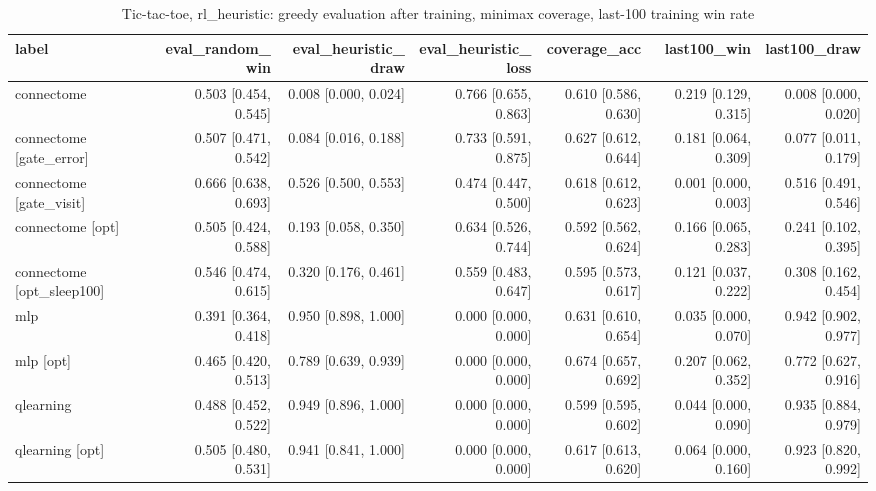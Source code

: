 \begin{table}[t]
\centering
\small
\begin{tabular}{lrrrrrr}
\toprule
label & eval\_random\_win & eval\_heuristic\_draw & eval\_heuristic\_loss & coverage\_acc & last100\_win & last100\_draw \\
\midrule
connectome & 0.503 [0.454, 0.545] & 0.008 [0.000, 0.024] & 0.766 [0.655, 0.863] & 0.610 [0.586, 0.630] & 0.219 [0.129, 0.315] & 0.008 [0.000, 0.020] \\
connectome [gate\_error] & 0.507 [0.471, 0.542] & 0.084 [0.016, 0.188] & 0.733 [0.591, 0.875] & 0.627 [0.612, 0.644] & 0.181 [0.064, 0.309] & 0.077 [0.011, 0.179] \\
connectome [gate\_visit] & 0.666 [0.638, 0.693] & 0.526 [0.500, 0.553] & 0.474 [0.447, 0.500] & 0.618 [0.612, 0.623] & 0.001 [0.000, 0.003] & 0.516 [0.491, 0.546] \\
connectome [opt] & 0.505 [0.424, 0.588] & 0.193 [0.058, 0.350] & 0.634 [0.526, 0.744] & 0.592 [0.562, 0.624] & 0.166 [0.065, 0.283] & 0.241 [0.102, 0.395] \\
connectome [opt\_sleep100] & 0.546 [0.474, 0.615] & 0.320 [0.176, 0.461] & 0.559 [0.483, 0.647] & 0.595 [0.573, 0.617] & 0.121 [0.037, 0.222] & 0.308 [0.162, 0.454] \\
mlp & 0.391 [0.364, 0.418] & 0.950 [0.898, 1.000] & 0.000 [0.000, 0.000] & 0.631 [0.610, 0.654] & 0.035 [0.000, 0.070] & 0.942 [0.902, 0.977] \\
mlp [opt] & 0.465 [0.420, 0.513] & 0.789 [0.639, 0.939] & 0.000 [0.000, 0.000] & 0.674 [0.657, 0.692] & 0.207 [0.062, 0.352] & 0.772 [0.627, 0.916] \\
qlearning & 0.488 [0.452, 0.522] & 0.949 [0.896, 1.000] & 0.000 [0.000, 0.000] & 0.599 [0.595, 0.602] & 0.044 [0.000, 0.090] & 0.935 [0.884, 0.979] \\
qlearning [opt] & 0.505 [0.480, 0.531] & 0.941 [0.841, 1.000] & 0.000 [0.000, 0.000] & 0.617 [0.613, 0.620] & 0.064 [0.000, 0.160] & 0.923 [0.820, 0.992] \\
\bottomrule
\end{tabular}
\caption{Tic-tac-toe, rl\_heuristic: greedy evaluation after training, minimax coverage, last-100 training win rate}
\label{tab:tictactoe_rl_heuristic}
\end{table}